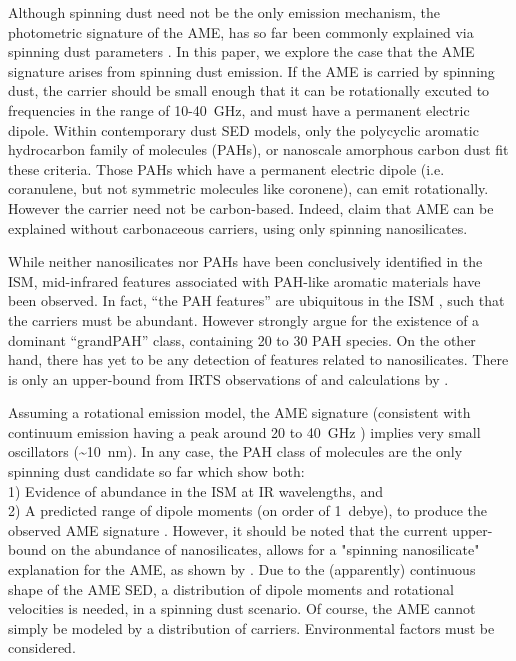 \documentclass[preprint2,longabstract]{aastex}
\begin{document}
     Although spinning dust need not be the only emission mechanism, the photometric signature of the AME, has so far been commonly explained via spinning dust parameters \citep{ysard11,ali-haimoud10}. In this paper, we explore the case that the AME signature arises from spinning dust emission. If the AME is carried by spinning dust, the carrier should be small enough that it can be rotationally excuted to frequencies in the range of 10-40~GHz, and must have a permanent electric dipole. Within contemporary dust SED models, only the polycyclic aromatic hydrocarbon family of molecules (PAHs), or nanoscale amorphous carbon dust fit these criteria. Those PAHs which have a permanent electric dipole (i.e. coranulene, but not symmetric molecules like coronene), can emit rotationally. However the carrier need not be carbon-based. Indeed, \cite{hensley17a} claim that AME can be explained without carbonaceous carriers, using only spinning nanosilicates.

     While neither nanosilicates nor PAHs have been conclusively identified in the ISM, mid-infrared features associated with PAH-like aromatic materials have been observed. In fact, ``the PAH features'' are ubiquitous in the ISM \citep{giard94,onaka96,onaka00}, such that the carriers must be abundant.  However \cite{andrews15} strongly argue for the  existence of a dominant ``grandPAH'' class, containing 20 to 30 PAH species. On the other hand, there has yet to be any detection of features related to nanosilicates. There is only an upper-bound from IRTS observations of \cite{onaka96} and calculations by \cite{li01}.

     Assuming a rotational emission model, the AME signature (consistent with continuum emission having a peak around 20 to 40~GHz ) implies very small oscillators (\textasciitilde{}10~nm). In any case, the PAH class of molecules are the only spinning dust candidate so far which show both: \\
     1) Evidence of abundance in the ISM at IR wavelengths, and \\
     2) A predicted range of dipole moments (on order of 1~debye), to produce the observed AME signature \citep{draine98b, lovas05, thorwirth07}. However, it should be noted that the current upper-bound on the abundance of nanosilicates, allows for a "spinning nanosilicate" explanation for the AME, as shown by \cite{hensley17a}. Due to the (apparently) continuous shape of the AME SED, a distribution of dipole moments and rotational velocities is needed, in a spinning dust scenario. Of course, the AME cannot simply be modeled by a distribution of carriers. Environmental factors must be considered.
\end{document}
